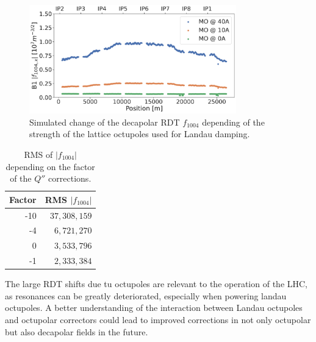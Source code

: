 \begin{figure}[!htb]
    \centering
    \includegraphics[width=0.8\textwidth]{./images/f1004/f1004_mo.pdf}
    \caption{Simulated change of the decapolar RDT $f_{1004}$ depending of the strength of the
    lattice octupoles used for Landau damping.}
    \label{fig:decapoles:rdts:simulation_mo_powered}
\end{figure}


\begin{table}[!htb]
    \centering
    \begin{tabular}{rr}
    \toprule
    Factor & RMS $|f_{1004}|$ \\
    \midrule
       -10 & $37,308,159$         \\ 
        -4 &  $6,721,270$          \\ 
         0 &  $3,533,796$          \\ 
        -1 &  $2,333,384$          \\
    \bottomrule
    \end{tabular}
    \caption{RMS of $|f_{1004}|$ depending on the factor of the $Q''$ corrections.}
    \label{table:decapoles:corrections_dq2_f1004_rms}
\end{table}

The large RDT shifts due tu octupoles are relevant to the operation of the LHC, as
resonances can be greatly deteriorated, especially when powering landau octupoles.
A better understanding of the interaction between Landau octupoles and octupolar correctors could
lead to improved corrections in not only octupolar but also decapolar fields in the future.



\FloatBarrier
\subsubsection{}

